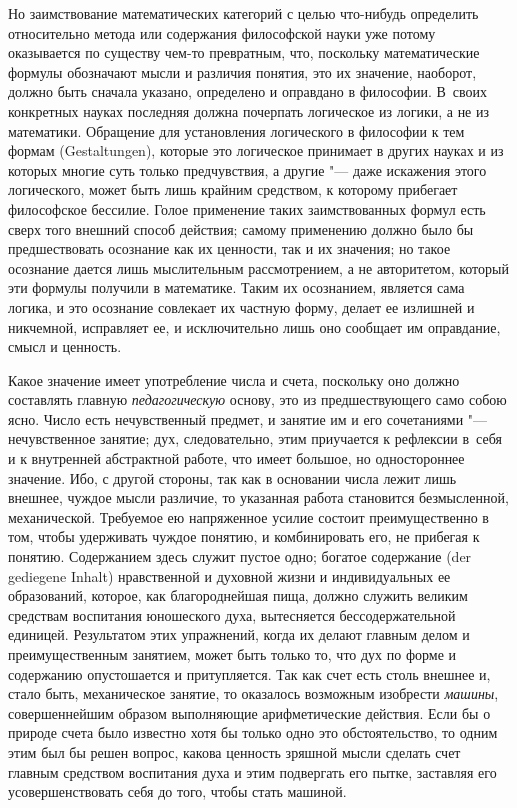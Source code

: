 Но заимствование математических категорий с целью что-нибудь определить
относительно метода или содержания философской науки уже потому оказывается по
существу чем-то превратным, что, поскольку математические формулы обозначают
мысли и различия понятия, это их значение, наоборот, должно быть сначала
указано, определено и оправдано в философии. В~своих конкретных науках
последняя должна почерпать логическое из логики, а не из математики. Обращение
для установления логического в философии к тем формам (Gestal\-tungen), которые
это логическое принимает в других науках и из которых многие суть только
предчувствия, а другие "--- даже искажения этого логического, может быть лишь
крайним средством, к которому прибегает философское бессилие. Голое применение
таких заимствованных формул есть сверх того внешний способ действия; самому
применению должно было бы предшествовать осознание как их ценности, так и их
значения; но такое осознание дается лишь мыслительным рассмотрением, а не
авторитетом, который эти формулы получили в математике. Таким их осознанием,
является сама логика, и это осознание совлекает их частную форму, делает ее
излишней и никчемной, исправляет ее, и исключительно лишь оно сообщает им
оправдание, смысл и ценность.

Какое значение имеет употребление числа и счета, поскольку оно должно
составлять главную {\em педагогическую} основу, это из предшествующего само
собою ясно. Число есть нечувственный предмет, и занятие им и его сочетаниями
"--- нечувственное занятие; дух, следовательно, этим приучается к рефлексии
в~себя и к внутренней абстрактной работе, что имеет большое, но одностороннее
значение. Ибо, с другой стороны, так как в основании числа лежит лишь внешнее,
чуждое мысли различие, то указанная работа становится безмысленной,
механической. Требуемое ею напряженное усилие состоит преимущественно в том,
чтобы удерживать чуждое понятию, и комбинировать его, не прибегая к понятию.
Содержанием здесь служит пустое одно; богатое содержание (der gediegene Inhalt)
нравственной и духовной жизни и индивидуальных ее образований, которое, как
благороднейшая пища, должно служить великим средствам воспитания юношеского
духа, вытесняется бессодержательной единицей. Результатом этих упражнений,
когда их делают главным делом и преимущественным занятием, может быть только
то, что дух по форме и содержанию опустошается и притупляется. Так как счет
есть столь внешнее и, стало быть, механическое занятие, то оказалось возможным
изобрести {\em машины}, совершеннейшим образом выполняющие арифметические
действия. Если бы о природе счета было известно хотя бы только одно это
обстоятельство, то одним этим был бы решен вопрос, какова ценность зряшной
мысли сделать счет главным средством воспитания духа и этим подвергать его
пытке, заставляя его усовершенствовать себя до того, чтобы стать машиной.

